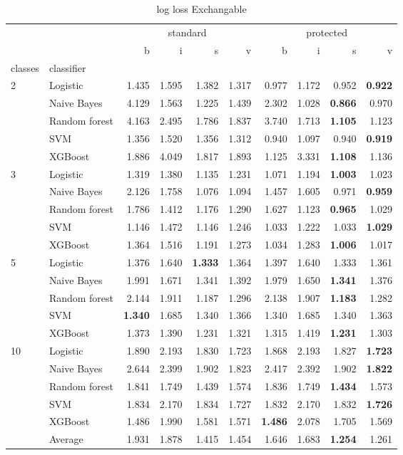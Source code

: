 \begin{table}
\caption{log loss Exchangable}
\begin{tabular}{l|l|rrrr|rrrr}
\toprule
 &  & \multicolumn{4}{c}{standard} & \multicolumn{4}{c}{protected} \\
 &  & b & i & s & v & b & i & s & v \\
classes & classifier &  &  &  &  &  &  &  &  \\
\midrule
\midrule
\multirow[c]{5}{*}{2} & Logistic & 1.435 & 1.595 & 1.382 & 1.317 & 0.977 & 1.172 & 0.952 & \textbf{0.922} \\
 & Naive Bayes & 4.129 & 1.563 & 1.225 & 1.439 & 2.302 & 1.028 & \textbf{0.866} & 0.970 \\
 & Random forest & 4.163 & 2.495 & 1.786 & 1.837 & 3.740 & 1.713 & \textbf{1.105} & 1.123 \\
 & SVM & 1.356 & 1.520 & 1.356 & 1.312 & 0.940 & 1.097 & 0.940 & \textbf{0.919} \\
 & XGBoost & 1.886 & 4.049 & 1.817 & 1.893 & 1.125 & 3.331 & \textbf{1.108} & 1.136 \\
\midrule
\multirow[c]{5}{*}{3} & Logistic & 1.319 & 1.380 & 1.135 & 1.231 & 1.071 & 1.194 & \textbf{1.003} & 1.023 \\
 & Naive Bayes & 2.126 & 1.758 & 1.076 & 1.094 & 1.457 & 1.605 & 0.971 & \textbf{0.959} \\
 & Random forest & 1.786 & 1.412 & 1.176 & 1.290 & 1.627 & 1.123 & \textbf{0.965} & 1.029 \\
 & SVM & 1.146 & 1.472 & 1.146 & 1.246 & 1.033 & 1.222 & 1.033 & \textbf{1.029} \\
 & XGBoost & 1.364 & 1.516 & 1.191 & 1.273 & 1.034 & 1.283 & \textbf{1.006} & 1.017 \\
\midrule
\multirow[c]{5}{*}{5} & Logistic & 1.376 & 1.640 & \textbf{1.333} & 1.364 & 1.397 & 1.640 & 1.333 & 1.361 \\
 & Naive Bayes & 1.991 & 1.671 & 1.341 & 1.392 & 1.979 & 1.650 & \textbf{1.341} & 1.376 \\
 & Random forest & 2.144 & 1.911 & 1.187 & 1.296 & 2.138 & 1.907 & \textbf{1.183} & 1.282 \\
 & SVM & \textbf{1.340} & 1.685 & 1.340 & 1.366 & 1.340 & 1.685 & 1.340 & 1.363 \\
 & XGBoost & 1.373 & 1.390 & 1.231 & 1.321 & 1.315 & 1.419 & \textbf{1.231} & 1.303 \\
\midrule
\multirow[c]{5}{*}{10} & Logistic & 1.890 & 2.193 & 1.830 & 1.723 & 1.868 & 2.193 & 1.827 & \textbf{1.723} \\
 & Naive Bayes & 2.644 & 2.399 & 1.902 & 1.823 & 2.417 & 2.392 & 1.902 & \textbf{1.822} \\
 & Random forest & 1.841 & 1.749 & 1.439 & 1.574 & 1.836 & 1.749 & \textbf{1.434} & 1.573 \\
 & SVM & 1.834 & 2.170 & 1.834 & 1.727 & 1.832 & 2.170 & 1.832 & \textbf{1.726} \\
 & XGBoost & 1.486 & 1.990 & 1.581 & 1.571 & \textbf{1.486} & 2.078 & 1.705 & 1.569 \\\midrule\ & Average & 1.931 & 1.878 & 1.415 & 1.454 & 1.646 & 1.683 & \textbf{1.254} & 1.261 \\
\bottomrule
\end{tabular}
\end{table}
